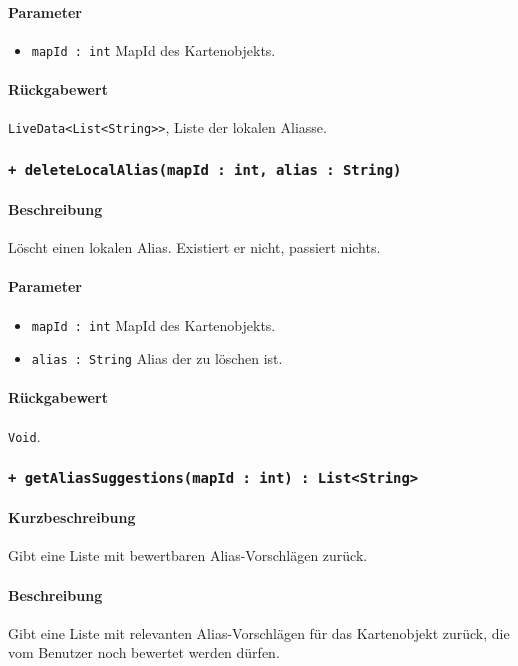 \paragraph*{Parameter}
\begin{itemize}
    \item \texttt{mapId : int} MapId des Kartenobjekts.
\end{itemize}
\paragraph*{Rückgabewert}
\texttt{LiveData<List<String>>}, Liste der lokalen Aliasse.

\subsubsection*{\texttt{+ deleteLocalAlias(mapId : int, alias : String)}}\label{App_AddAlias_IAliasDataProvider_deleteLocalAlias}%
\paragraph*{Beschreibung}
Löscht einen lokalen Alias. Existiert er nicht, passiert nichts.
\paragraph*{Parameter}
\begin{itemize}
    \item \texttt{mapId : int} MapId des Kartenobjekts.
    \item \texttt{alias : String} Alias der zu löschen ist.
\end{itemize}
\paragraph*{Rückgabewert}
\texttt{Void}.

\subsubsection*{\texttt{+ getAliasSuggestions(mapId : int) : List<String>}}\label{App_AddAlias_IAliasDataProvider_getAliasSuggestions}%
\paragraph*{Kurzbeschreibung}
Gibt eine Liste mit bewertbaren Alias-Vorschlägen zurück.
\paragraph*{Beschreibung}
Gibt eine Liste mit relevanten Alias-Vorschlägen für das Kartenobjekt zurück, 
die vom Benutzer noch bewertet werden dürfen.
